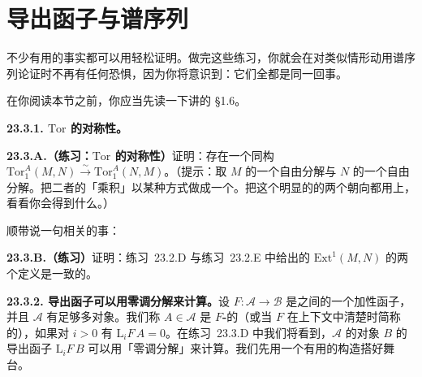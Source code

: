 
\section{导出函子与谱序列}

不少有用的事实都可以用\trSpectralSequence{}轻松证明。做完这些练习，你就会在对类似情形动用谱序列论证时不再有任何恐惧，因为你将意识到：它们全都是同一回事。

在你阅读本节之前，你应当先读一下讲\trSpectralSequence{}的 \S1.6。

\textbf{23.3.1. $\mathrm{Tor}$ 的对称性。}\quad

\textbf{23.3.A.（练习：$\mathrm{Tor}$ 的对称性）}\quad 证明：存在一个同构 $\mathrm{Tor}^A_1(M,N)\overset{\sim}{\longrightarrow}\mathrm{Tor}^A_1(N,M)$。（提示：取 $M$ 的一个自由分解与 $N$ 的一个自由分解。把二者的「乘积」以某种方式做成一个\trDoubleComplex。把这个明显的\trSpectralSequence{}的两个朝向都用上，看看你会得到什么。）

顺带说一句相关的事：

\textbf{23.3.B.（练习）}\quad 证明：\mbox{练习~23.2.D} 与\mbox{练习~23.2.E} 中给出的 $\mathrm{Ext}^1(M,N)$ 的两个定义是一致的。

\textbf{23.3.2. 导出函子可以用零调分解来计算。}\quad 设 $F\colon\mathscr{A}\to\mathscr{B}$ 是\trAbelianCategory{}之间的一个\trRightExact{}加性函子，并且 $\mathscr{A}$ 有足够多\trProjectiveObj{}对象。我们称 $A\in\mathscr{A}$ 是 \textbf{$F$-\trAcyclic}的（或当 $F$ 在上下文中清楚时简称\textbf{\trAcyclic}的），如果对 $i>0$ 有 $\mathrm{L}_iF\,A=0$。在\mbox{练习~23.3.D} 中我们将看到，$\mathscr{A}$ 的对象 $B$ 的导出函子 $\mathrm{L}_iF\,B$ 可以用「零调分解」来计算。我们先用一个有用的构造搭好舞台。

